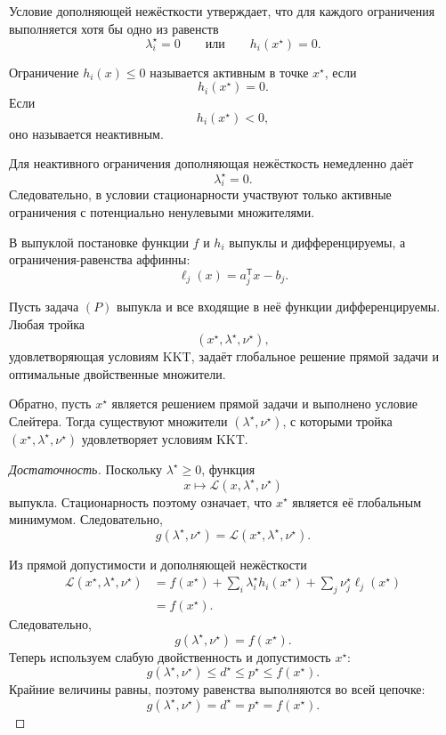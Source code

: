 Условие дополняющей нежёсткости утверждает, что для каждого
ограничения выполняется хотя бы одно из равенств
\[
    \lambda_i^\star=0
    \qquad\text{или}\qquad
    h_i(x^\star)=0.
\]

\begin{definition}
Ограничение \(h_i(x)\le0\) называется активным в точке \(x^\star\),
если
\[
    h_i(x^\star)=0.
\]
Если
\[
    h_i(x^\star)<0,
\]
оно называется неактивным.
\end{definition}

Для неактивного ограничения дополняющая нежёсткость немедленно даёт
\[
    \lambda_i^\star=0.
\]
Следовательно, в условии стационарности участвуют только активные
ограничения с потенциально ненулевыми множителями.



В выпуклой постановке функции \(f\) и \(h_i\) выпуклы и
дифференцируемы, а ограничения-равенства аффинны:
\[
    \ell_j(x)=a_j^{\mathsf T}x-b_j.
\]

\begin{theorem}
Пусть задача \((P)\) выпукла и все входящие в неё функции
дифференцируемы. Любая тройка
\[
    (x^\star,\lambda^\star,\nu^\star),
\]
удовлетворяющая условиям KKT, задаёт глобальное решение прямой задачи
и оптимальные двойственные множители.

Обратно, пусть \(x^\star\) является решением прямой задачи и
выполнено условие Слейтера. Тогда существуют множители
\((\lambda^\star,\nu^\star)\), с которыми тройка
\((x^\star,\lambda^\star,\nu^\star)\) удовлетворяет условиям KKT.
\end{theorem}

\begin{proof}[Достаточность]
Поскольку \(\lambda^\star\ge0\), функция
\[
    x\longmapsto
    \mathcal L(x,\lambda^\star,\nu^\star)
\]
выпукла. Стационарность поэтому означает, что \(x^\star\) является
её глобальным минимумом. Следовательно,
\[
    g(\lambda^\star,\nu^\star)
    =
    \mathcal L
    (x^\star,\lambda^\star,\nu^\star).
\]

Из прямой допустимости и дополняющей нежёсткости
\[
\begin{aligned}
    \mathcal L
    (x^\star,\lambda^\star,\nu^\star)
    &=
    f(x^\star)
    +
    \sum_i
    \lambda_i^\star h_i(x^\star)
    +
    \sum_j
    \nu_j^\star\ell_j(x^\star)
    \\
    &=
    f(x^\star).
\end{aligned}
\]
Следовательно,
\[
    g(\lambda^\star,\nu^\star)
    =
    f(x^\star).
\]
Теперь используем слабую двойственность и допустимость
\(x^\star\):
\[
    g(\lambda^\star,\nu^\star)
    \le
    d^\star
    \le
    p^\star
    \le
    f(x^\star).
\]
Крайние величины равны, поэтому равенства выполняются во всей цепочке:
\[
    g(\lambda^\star,\nu^\star)
    =d^\star=p^\star=f(x^\star).
\]
\end{proof}

